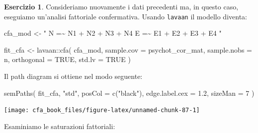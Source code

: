 \documentclass[
  11pt,
]{krantz}
\makeatletter
\newenvironment{Shaded}{\begin{snugshade}}{\end{snugshade}}
\newcommand{\AttributeTok}[1]{\textcolor[rgb]{0.61,0.61,0.61}{#1}}
\newcommand{\ConstantTok}[1]{\textcolor[rgb]{0,0,0}{#1}}
\newcommand{\DecValTok}[1]{\textcolor[rgb]{0.06,0.06,0.06}{#1}}
\newcommand{\FloatTok}[1]{\textcolor[rgb]{0.06,0.06,0.06}{#1}}
\newcommand{\FunctionTok}[1]{\textcolor[rgb]{0,0,0}{#1}}
\newcommand{\NormalTok}[1]{#1}
\newcommand{\OtherTok}[1]{\textcolor[rgb]{0.37,0.37,0.37}{#1}}
\newcommand{\SpecialCharTok}[1]{\textcolor[rgb]{0,0,0}{#1}}
\newcommand{\StringTok}[1]{\textcolor[rgb]{0.5,0.5,0.5}{#1}}
\newenvironment{kframe}{%
\medskip{}
\setlength{\fboxsep}{.8em}
 \def\at@end@of@kframe{}%
 \ifinner\ifhmode%
  \def\at@end@of@kframe{\end{minipage}}%
  \begin{minipage}{\columnwidth}%
 \fi\fi%
 \def\FrameCommand##1{\hskip\@totalleftmargin \hskip-\fboxsep
 \colorbox{shadecolor}{##1}\hskip-\fboxsep
     \hskip-\linewidth \hskip-\@totalleftmargin \hskip\columnwidth}%
 \MakeFramed {\advance\hsize-\width
   \@totalleftmargin\z@ \linewidth\hsize
   \@setminipage}}%
 {\par\unskip\endMakeFramed%
 \at@end@of@kframe}
\renewenvironment{Shaded}{\begin{kframe}}{\end{kframe}}
\theoremstyle{definition}
\theoremstyle{definition}
\theoremstyle{definition}
\newtheorem{exercise}{Esercizio}[chapter]
\theoremstyle{definition}
\theoremstyle{remark}
\makeatother
\begin{document}
\begin{exercise}
Consideriamo nuovamente i dati precedenti ma, in questo caso, eseguiamo un'analisi fattoriale confermativa. Usando \texttt{lavaan} il modello diventa:

\begin{Shaded}
\begin{Highlighting}[]
\NormalTok{cfa\_mod }\OtherTok{\textless{}{-}} \StringTok{"}
\StringTok{  N =\textasciitilde{} N1 + N2 + N3 + N4}
\StringTok{  E =\textasciitilde{} E1 + E2 + E3 + E4}
\StringTok{"}
\end{Highlighting}
\end{Shaded}

\begin{Shaded}
\begin{Highlighting}[]
\NormalTok{fit\_cfa }\OtherTok{\textless{}{-}}\NormalTok{ lavaan}\SpecialCharTok{::}\FunctionTok{cfa}\NormalTok{(}
\NormalTok{  cfa\_mod,}
  \AttributeTok{sample.cov =}\NormalTok{ psychot\_cor\_mat,}
  \AttributeTok{sample.nobs =}\NormalTok{ n,}
  \AttributeTok{orthogonal =} \ConstantTok{TRUE}\NormalTok{,}
  \AttributeTok{std.lv =} \ConstantTok{TRUE}
\NormalTok{)}
\end{Highlighting}
\end{Shaded}

Il path diagram si ottiene nel modo seguente:

\begin{Shaded}
\begin{Highlighting}[]
\FunctionTok{semPaths}\NormalTok{(}
\NormalTok{  fit\_cfa,}
  \StringTok{"std"}\NormalTok{,}
  \AttributeTok{posCol =} \FunctionTok{c}\NormalTok{(}\StringTok{"black"}\NormalTok{),}
  \AttributeTok{edge.label.cex =} \FloatTok{1.2}\NormalTok{,}
  \AttributeTok{sizeMan =} \DecValTok{7}
\NormalTok{)}
\end{Highlighting}
\end{Shaded}

\begin{center}\texttt{[image: cfa\_book\_files/figure-latex/unnamed-chunk-87-1]} \end{center}

Esaminiamo le saturazioni fattoriali:


\end{exercise}
\end{document}
